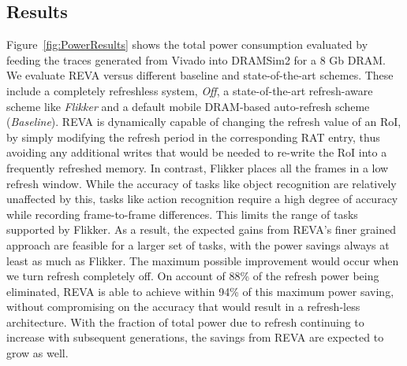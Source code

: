 \subsection{Results}
Figure~\ref{fig:PowerResults} shows the total power consumption evaluated by feeding the traces generated from Vivado into DRAMSim2 for a 8 Gb DRAM. We evaluate REVA versus different baseline and state-of-the-art schemes. These include a completely refreshless system, \emph{Off}, a state-of-the-art refresh-aware scheme like \emph{Flikker} and a default mobile DRAM-based auto-refresh scheme (\emph{Baseline}). %
REVA is dynamically capable of changing the refresh value of an RoI, by simply modifying the refresh period in the corresponding RAT entry, thus avoiding any additional writes that would be needed to re-write the RoI into a frequently refreshed memory. In contrast, Flikker places all the frames in a low refresh window. While the accuracy of tasks like object recognition are relatively unaffected by this, tasks like action recognition require a high degree of accuracy while recording frame-to-frame differences. 
This limits the range of tasks supported by Flikker. As a result, the expected gains from REVA's finer grained approach are feasible for a larger set of tasks, with the power savings always at least as much as Flikker.
The maximum possible improvement would occur when we turn refresh completely off. On account of 88\% of the refresh power being eliminated, REVA is able to achieve within 94\% of this maximum power saving, without compromising on the accuracy that would result in a refresh-less architecture. With the fraction of total power due to refresh continuing to increase with subsequent generations, the savings from REVA are expected to grow as well.



